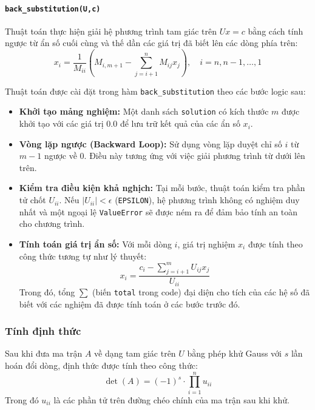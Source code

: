 \documentclass[12pt,a4paper]{article}
\begin{document}
\paragraph{\texttt{\textbf{back\_substitution(U,c)}}}
Thuật toán thực hiện giải hệ phương trình tam giác trên $Ux = c$ bằng cách tính ngược từ ẩn số cuối cùng và thế dần các giá trị đã biết lên các dòng phía trên:
\begin{equation}
x_i = \frac{1}{M_{ii}} \left( M_{i, m+1} - \sum_{j=i+1}^{n} M_{ij} x_j \right), \quad i = n, n-1, \dots, 1
\end{equation}

Thuật toán được cài đặt trong hàm \texttt{back\_substitution} theo các bước logic sau:
\begin{itemize}
    \item \textbf{Khởi tạo mảng nghiệm:} Một danh sách \texttt{solution} có kích thước $m$ được khởi tạo với các giá trị $0.0$ để lưu trữ kết quả của các ẩn số $x_i$.
    
    \item \textbf{Vòng lặp ngược (Backward Loop):} Sử dụng vòng lặp duyệt chỉ số $i$ từ $m-1$ ngược về $0$. Điều này tương ứng với việc giải phương trình từ dưới lên trên.
    
    \item \textbf{Kiểm tra điều kiện khả nghịch:} Tại mỗi bước, thuật toán kiểm tra phần tử chốt $U_{ii}$. Nếu $|U_{ii}| < \epsilon$ (\texttt{EPSILON}), hệ phương trình không có nghiệm duy nhất và một ngoại lệ \texttt{ValueError} sẽ được ném ra để đảm bảo tính an toàn cho chương trình.
    
    \item \textbf{Tính toán giá trị ẩn số:}
    Với mỗi dòng $i$, giá trị nghiệm $x_i$ được tính theo công thức tương tự như lý thuyết:
    $$x_i = \frac{c_i - \sum_{j=i+1}^{m} U_{ij}x_j}{U_{ii}}$$
    Trong đó, tổng $\sum$ (biến \texttt{total} trong code) đại diện cho tích của các hệ số đã biết với các nghiệm đã được tính toán ở các bước trước đó.
\end{itemize}

\subsubsection{Tính định thức}
Sau khi đưa ma trận $A$ về dạng tam giác trên $U$ bằng phép khử Gauss với $s$ lần hoán đổi dòng, định thức được tính theo công thức:
\begin{equation}
    \det(A) = (-1)^s \cdot \prod_{i=1}^{n} u_{ii}
\end{equation}
Trong đó $u_{ii}$ là các phần tử trên đường chéo chính của ma trận sau khi khử.
\end{document}
